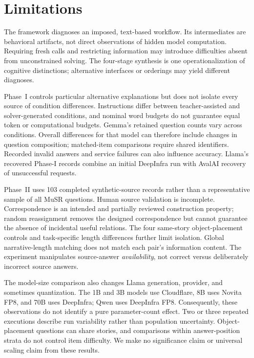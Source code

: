 \section*{Limitations}
The framework diagnoses an imposed, text-based workflow. Its intermediates are behavioral artifacts, not direct observations of hidden model computation. Requiring fresh calls and restricting information may introduce difficulties absent from unconstrained solving. The four-stage synthesis is one operationalization of cognitive distinctions; alternative interfaces or orderings may yield different diagnoses.

Phase~I controls particular alternative explanations but does not isolate every source of condition differences. Instructions differ between teacher-assisted and solver-generated conditions, and nominal word budgets do not guarantee equal token or computational budgets. Gemma's retained question counts vary across conditions. Overall differences for that model can therefore include changes in question composition; matched-item comparisons require shared identifiers. Recorded invalid answers and service failures can also influence accuracy. Llama's recovered Phase-I records combine an initial DeepInfra run with AvalAI recovery of unsuccessful requests.

Phase~II uses 103 completed synthetic-source records rather than a representative sample of all MuSR questions. Human source validation is incomplete. Correspondence is an intended and partially reviewed construction property; random reassignment removes the designed correspondence but cannot guarantee the absence of incidental useful relations. The four same-story object-placement controls and task-specific length differences further limit isolation. Global narrative-length matching does not match each pair's information content. The experiment manipulates source-answer \emph{availability}, not correct versus deliberately incorrect source answers.

The model-size comparison also changes Llama generation, provider, and sometimes quantization. The 1B and 3B models use Cloudflare, 8B uses Novita FP8, and 70B uses DeepInfra; Qwen uses DeepInfra FP8. Consequently, these observations do not identify a pure parameter-count effect. Two or three repeated executions describe run variability rather than population uncertainty. Object-placement questions can share stories, and comparisons within answer-position strata do not control item difficulty. We make no significance claim or universal scaling claim from these results.

